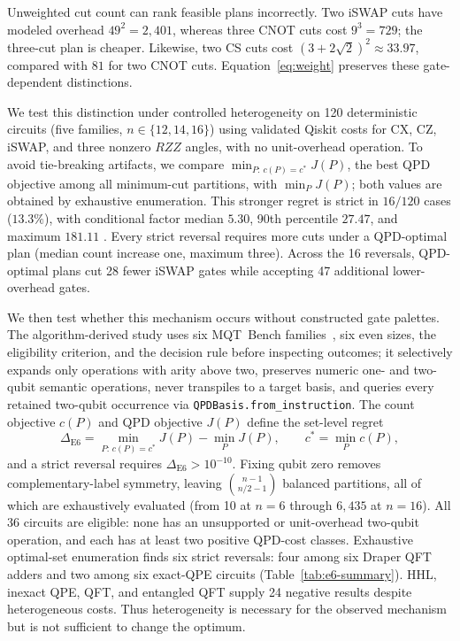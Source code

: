 \documentclass[
  aps,
  pra,
  reprint,
  amsmath,
  amssymb,
  longbibliography,
  nofootinbib,
  floatfix
]{revtex4-2}
\theoremstyle{plain}
\begin{document}
Unweighted cut count can rank feasible plans incorrectly. Two iSWAP cuts have modeled overhead $49^2=2{,}401$, whereas three CNOT cuts cost $9^3=729$; the three-cut plan is cheaper. Likewise, two CS cuts cost $(3+2\sqrt{2})^2\approx33.97$, compared with $81$ for two CNOT cuts. Equation~\eqref{eq:weight} preserves these gate-dependent distinctions.

We test this distinction under controlled heterogeneity on 120 deterministic circuits (five families, $n\in\{12,14,16\}$) using validated Qiskit costs for CX, CZ, iSWAP, and three nonzero $RZZ$ angles, with no unit-overhead operation. To avoid tie-breaking artifacts, we compare $\min_{P:\,c(P)=c^*}J(P)$, the best QPD objective among all minimum-cut partitions, with $\min_PJ(P)$; both values are obtained by exhaustive enumeration. This stronger regret is strict in $16/120$ cases ($13.3\%$), with conditional factor median $5.30$, 90th percentile $27.47$, and maximum $181.11$ . Every strict reversal requires more cuts under a QPD-optimal plan (median count increase one, maximum three). Across the 16 reversals, QPD-optimal plans cut 28 fewer iSWAP gates while accepting 47 additional lower-overhead gates.

We then test whether this mechanism occurs without constructed gate palettes. The algorithm-derived study uses six MQT~Bench families~\cite{mqtbench}, six even sizes, the eligibility criterion, and the decision rule before inspecting outcomes; it selectively expands only operations with arity above two, preserves numeric one- and two-qubit semantic operations, never transpiles to a target basis, and queries every retained two-qubit occurrence via \texttt{QPDBasis.from\_instruction}. The count objective $c(P)$ and QPD objective $J(P)$ define the set-level regret
\begin{equation}
  \Delta_{\mathrm{E6}} =
  \min_{P:\,c(P)=c^*} J(P) - \min_P J(P),
  \qquad c^* = \min_P c(P),
  \label{eq:e6-regret}
\end{equation}
and a strict reversal requires $\Delta_{\mathrm{E6}}>10^{-10}$. Fixing qubit zero removes complementary-label symmetry, leaving $\binom{n-1}{n/2-1}$ balanced partitions, all of which are exhaustively evaluated (from 10 at $n=6$ through $6{,}435$ at $n=16$). All 36 circuits are eligible: none has an unsupported or unit-overhead two-qubit operation, and each has at least two positive QPD-cost classes. Exhaustive optimal-set enumeration finds six strict reversals: four among six Draper QFT adders and two among six exact-QPE circuits (Table~\ref{tab:e6-summary}). HHL, inexact QPE, QFT, and entangled QFT supply 24 negative results despite heterogeneous costs. Thus heterogeneity is necessary for the observed mechanism but is not sufficient to change the optimum.
\end{document}
